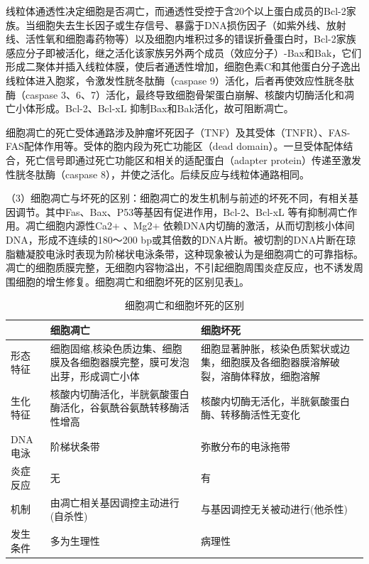 线粒体通透性决定细胞是否凋亡，而通透性受控于含20个以上蛋白成员的Bcl-2家族。当细胞失去生长因子或生存信号、暴露于DNA损伤因子（如紫外线、放射线、活性氧和细胞毒药物等）以及细胞内堆积过多的错误折叠蛋白时，Bcl-2家族感应分子即被活化，继之活化该家族另外两个成员（效应分子）-Bax和Bak，它们形成二聚体并插入线粒体膜，使后者通透性增加，细胞色素C和其他蛋白分子逸出线粒体进入胞浆，令激发性胱冬肽酶（caspase
9）活化，后者再使效应性胱冬肽酶（caspase
3、6、7）活化，最终导致细胞骨架蛋白崩解、核酸内切酶活化和凋亡小体形成。Bcl-2、Bcl-x{L}
抑制Bax和Bak活化，故可阻断凋亡。

细胞凋亡的死亡受体通路涉及肿瘤坏死因子（TNF）及其受体（TNFR）、FAS-FAS配体作用等。受体的胞内段为死亡功能区（dead
domain）。一旦受体配体结合，死亡信号即通过死亡功能区和相关的适配蛋白（adapter
protein）传递至激发性胱冬肽酶（caspase
8），并使之活化。后续反应与线粒体通路相同。

（3）细胞凋亡与坏死的区别：细胞凋亡的发生机制与前述的坏死不同，有相关基因调节。其中Fas、Bax、P53等基因有促进作用，Bcl-2、Bcl-x{L}
等有抑制凋亡作用。凋亡细胞内源性Ca{2+} 、Mg{2+}
依赖DNA内切酶的激活，从而切割核小体间DNA，形成不连续的180～200
bp或其倍数的DNA片断。被切割的DNA片断在琼脂糖凝胶电泳时表现为阶梯状电泳条带，这种现象被认为是细胞凋亡的可靠指标。凋亡的细胞质膜完整，无细胞内容物溢出，不引起细胞周围炎症反应，也不诱发周围细胞的增生修复。细胞凋亡和细胞坏死的区别见表\ref{tab1-1}。

\begin{table}[ht]
	\caption{细胞凋亡和细胞坏死的区别}
	\label{tab1-1}
	\centering
	\begin{tabular}{lp{5cm}p{5cm}}
	\toprule
	 & 细胞凋亡 & 细胞坏死 \\
	\midrule
	形态特征 & 细胞固缩,核染色质边集、细胞膜及各细胞器膜完整，膜可发泡出芽，形成调亡小体
	& 细胞显著肿胀，核染色质絮状或边集，细胞膜及各细胞器膜溶解破裂，溶酶体释放，细胞溶解\\
	生化特征 & 核酸内切酶活化，半胱氨酸蛋白酶活化，谷氨酰谷氨酰转移酶活性增高
	& 核酸内切酶无活化，半胱氨酸蛋白酶、转移酶活性无变化\\
	DNA电泳 & 阶梯状条带 & 弥散分布的电泳拖带\\
	炎症反应 & 无 & 有\\
	机制 &  由凋亡相关基因调控主动进行(自杀性)	& 与基因调控无关被动进行(他杀性)\\
	发生条件 & 多为生理性 & 病理性\\
	\bottomrule
	\end{tabular}
  \end{table}
 

